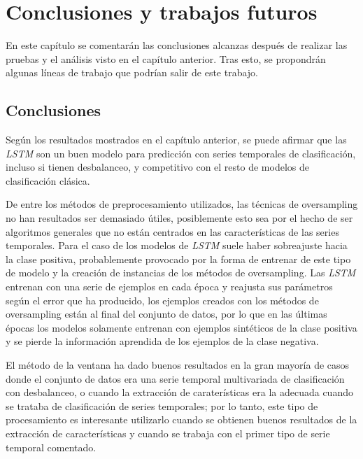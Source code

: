 \chapter{Conclusiones y trabajos futuros}
En este capítulo se comentarán las conclusiones alcanzas después de realizar las pruebas y el análisis visto en el capítulo anterior. Tras esto, se propondrán algunas líneas de trabajo que podrían salir de este trabajo.\newline

\section{Conclusiones}
Según los resultados mostrados en el capítulo anterior, se puede afirmar que las \textit{LSTM} son un buen modelo para predicción con series temporales de clasificación, incluso si tienen desbalanceo, y competitivo con el resto de modelos de clasificación clásica.\newline

De entre los métodos de preprocesamiento utilizados, las técnicas de oversampling no han resultados ser demasiado útiles, posiblemente esto sea por el hecho de ser algoritmos generales que no están centrados en las características de las series temporales. Para el caso de los modelos de \textit{LSTM} suele haber sobreajuste hacia la clase positiva, probablemente provocado por la forma de entrenar de este tipo de modelo y la creación de instancias de los métodos de oversampling. Las \textit{LSTM} entrenan con una serie de ejemplos en cada época y reajusta sus parámetros según el error que ha producido, los ejemplos creados con los métodos de oversampling están al final del conjunto de datos, por lo que en las últimas épocas los modelos solamente entrenan con ejemplos sintéticos de la clase positiva y se pierde la información aprendida de los ejemplos de la clase negativa. \newline

El método de la ventana ha dado buenos resultados en la gran mayoría de casos donde el conjunto de datos era una serie temporal multivariada de clasificación con desbalanceo, o cuando la extracción de caraterísticas era la adecuada cuando se trataba de clasificación de series temporales; por lo tanto, este tipo de procesamiento es interesante utilizarlo cuando se obtienen buenos resultados de la extracción de características y cuando se trabaja con el primer tipo de serie temporal comentado.\newline

